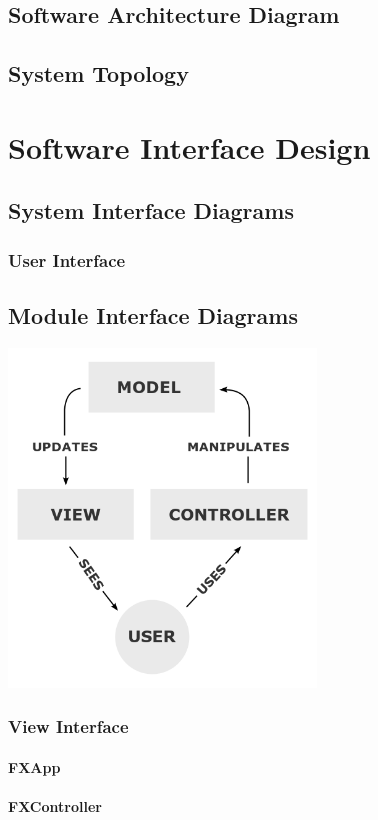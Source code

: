 \documentclass{scrreprt}
\begin{document}
\section{Software Architecture Diagram}
\section{System Topology}
\chapter{Software Interface Design}
\section{System Interface Diagrams}
\subsection{User Interface}
\section{Module Interface Diagrams}
\includegraphics[height=9cm]{MVC-Process.png}
\subsection{View Interface}
\subsubsection{FXApp}
\subsubsection{FXController}
\end{document}
